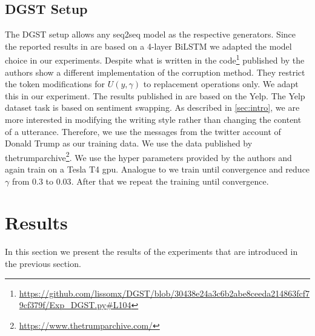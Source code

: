 \documentclass[twocolumn]{tum-article}
\begin{document}
\subsection{DGST Setup}\label{sec:dgst_setup}
The DGST setup allows any seq2seq model as the respective generators. Since the reported results in \cite{li2020dgst} are based on a 4-layer BiLSTM we adapted the model choice in our experiments. Despite what is written in \cite{li2020dgst} the code\footnote{\url{https://github.com/lissomx/DGST/blob/30438e24a3c6b2abe8ceeda214863fcf79cf379f/Exp\_DGST.py\#L104}} published by the authors show a different implementation of the corruption method. They restrict the token modifications for $U(y, \gamma)$ to replacement operations only. We adapt this in our experiment. The results published in \cite{li2020dgst} are based on the Yelp\cite{li2018delete}. The Yelp dataset task is based on sentiment swapping. As described in \autoref{sec:intro}, we are more interested in modifying the writing style rather than changing the content of a utterance. Therefore, we use the messages from the twitter account of Donald Trump as our training data. We use the data published by thetrumparchive\footnote{\url{https://www.thetrumparchive.com/}}. We use the hyper parameters provided by the authors and again train on a Tesla T4 gpu. Analogue to \cite{li2020dgst} we train until convergence and reduce $\gamma$ from $0.3$ to $0.03$. After that we repeat the training until convergence.     
\section{Results}
In this section we present the results of the experiments that are introduced in the previous section.  
\end{document}
